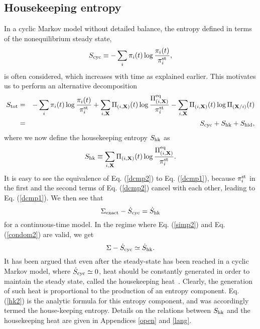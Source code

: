 \documentclass[aps,pre,amsmath,amssymb,floatfix,preprint,nofootinbib]{revtex4}
\begin{document}
\subsection{Housekeeping entropy}
In a cyclic Markov model without detailed balance, the entropy defined in terms of the nonequilibrium steady state,
\begin{equation}
S_{\rm cyc} \equiv -\sum_i \pi_i(t) \log \frac{\pi_i(t)}{\pi^{\rm st}_i}, \label{cy3}
\end{equation}
is often considered, which increases with time as explained earlier. This motivates us to perform an alternative decomposition 
\begin{eqnarray}
S_{\rm tot} &=&  -\sum_i \pi_i(t) \log \frac{\pi_i(t)}{\pi^{\rm st}_i} + \sum_{i,{\bf X}} \Pi_{(i,{\bf X})}(t) \log \frac{\Pi^{\rm eq}_{(i,{\bf X})}}{\pi^{\rm st}_i} -\sum_{i,{\bf X}} \Pi_{(i,{\bf X})}(t)  \log \Pi_{({\bf X}/i)}(t)\nonumber\\
&=& S_{\rm cyc} + S_{\rm hk} + S_{\rm hid},
 \label{dcmp2}
\end{eqnarray}
where we now define the housekeeping entropy $S_{\rm hk}$ as 
\begin{equation}
S_{\rm hk} \equiv \sum_{i,{\bf X}} \Pi_{(i,{\bf X})}(t) \log \frac{\Pi^{\rm eq}_{(i,{\bf X})}}{\pi^{\rm st}_i}.   \label{hk2}
\end{equation} 
It is easy to see the equivalence of Eq. (\ref{dcmp2}) to Eq. (\ref{dcmp1}), because $\pi^{\rm st}_i$ in the first and the second terms of Eq. (\ref{dcmp2}) cancel with each other, leading to Eq. (\ref{dcmp1}). We then see that
\begin{equation}
\Sigma_{\rm exact} - \dot S_{\rm cyc} = \dot S_{\rm hk}
\end{equation}
for a continuous-time model.
In the regime where Eq. (\ref{simp2}) and Eq. (\ref{condom2}) are valid, we get
\begin{equation}
\Sigma - \dot S_{\rm cyc} \simeq \dot S_{\rm hk}.
\end{equation}
It has been argued that even after the steady-state has been reached in a cyclic Markov model, where $\dot S_{\rm cyc} \simeq 0$, heat should be constantly generated in order to maintain the steady state,  called the housekeeping heat~\cite{hg,gq,op,hs,sp}. Clearly, the generation of such heat is proportional to the production of an entropy component. Eq. (\ref{hk2}) is the analytic formula for this entropy component, and was accordingly termed the house-keeping entropy. Details on the relations between $S_{\rm hk}$ and the housekeeping heat are given in Appendices \ref{open} and \ref{lang}.
\end{document}
